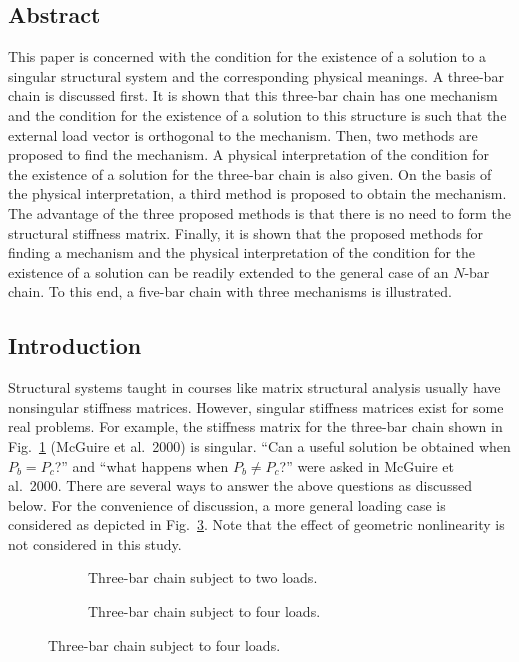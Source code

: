 \subsection*{Abstract}
This paper is concerned with the condition for the existence of a solution to a singular structural system and the corresponding physical meanings. A three-bar chain is discussed first. It is shown that this three-bar chain has one mechanism and the condition for the existence of a solution to this structure is such that the external load vector is orthogonal to the mechanism. Then, two methods are proposed to find the mechanism. A physical interpretation of the condition for the existence of a solution for the three-bar chain is also given. On the basis of the physical interpretation, a third method is proposed to obtain the mechanism. The advantage of the three proposed methods is that there is no need to form the structural stiffness matrix. Finally, it is shown that the proposed methods for finding a mechanism and the physical interpretation of the condition for the existence of a solution can be readily extended to the general case of an $N$-bar chain. To this end, a five-bar chain with three mechanisms is illustrated.

\subsection*{Introduction}
Structural systems taught in courses like matrix structural analysis usually have nonsingular stiffness matrices. However, singular stiffness matrices exist for some real problems. For example, the stiffness matrix for the three-bar chain shown in Fig.~\ref{fig:leu1} (McGuire et al.\ 2000) is singular. ``Can a useful solution be obtained when $P_b = P_c$?'' and ``what happens when $P_b\neq P_c$?'' were asked in McGuire et al.\ 2000. There are several ways to answer the above questions as discussed below. For the convenience of discussion, a more general loading case is considered as depicted in Fig.~\ref{fig:leu2}. Note that the effect of geometric nonlinearity is not considered in this study.

\begin{figure}[H]
  \centering
  \begin{subfigure}[b]{0.48\textwidth}\centering
    \caption{Three-bar chain subject to two loads.}\label{fig:leu1}\end{subfigure}\hfill
  \begin{subfigure}[b]{0.48\textwidth}\centering
    \caption{Three-bar chain subject to four loads.}\label{fig:leu2}\end{subfigure}
\end{figure}

